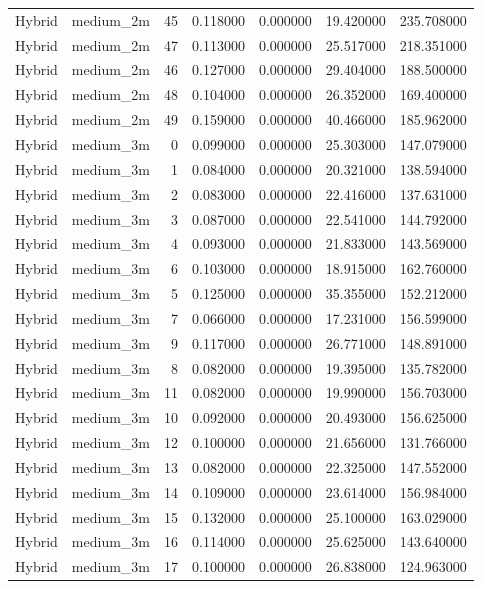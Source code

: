\begin{tabular}{llrrrrr}
Hybrid & medium_2m & 45 & 0.118000 & 0.000000 & 19.420000 & 235.708000 \\
Hybrid & medium_2m & 47 & 0.113000 & 0.000000 & 25.517000 & 218.351000 \\
Hybrid & medium_2m & 46 & 0.127000 & 0.000000 & 29.404000 & 188.500000 \\
Hybrid & medium_2m & 48 & 0.104000 & 0.000000 & 26.352000 & 169.400000 \\
Hybrid & medium_2m & 49 & 0.159000 & 0.000000 & 40.466000 & 185.962000 \\
Hybrid & medium_3m & 0 & 0.099000 & 0.000000 & 25.303000 & 147.079000 \\
Hybrid & medium_3m & 1 & 0.084000 & 0.000000 & 20.321000 & 138.594000 \\
Hybrid & medium_3m & 2 & 0.083000 & 0.000000 & 22.416000 & 137.631000 \\
Hybrid & medium_3m & 3 & 0.087000 & 0.000000 & 22.541000 & 144.792000 \\
Hybrid & medium_3m & 4 & 0.093000 & 0.000000 & 21.833000 & 143.569000 \\
Hybrid & medium_3m & 6 & 0.103000 & 0.000000 & 18.915000 & 162.760000 \\
Hybrid & medium_3m & 5 & 0.125000 & 0.000000 & 35.355000 & 152.212000 \\
Hybrid & medium_3m & 7 & 0.066000 & 0.000000 & 17.231000 & 156.599000 \\
Hybrid & medium_3m & 9 & 0.117000 & 0.000000 & 26.771000 & 148.891000 \\
Hybrid & medium_3m & 8 & 0.082000 & 0.000000 & 19.395000 & 135.782000 \\
Hybrid & medium_3m & 11 & 0.082000 & 0.000000 & 19.990000 & 156.703000 \\
Hybrid & medium_3m & 10 & 0.092000 & 0.000000 & 20.493000 & 156.625000 \\
Hybrid & medium_3m & 12 & 0.100000 & 0.000000 & 21.656000 & 131.766000 \\
Hybrid & medium_3m & 13 & 0.082000 & 0.000000 & 22.325000 & 147.552000 \\
Hybrid & medium_3m & 14 & 0.109000 & 0.000000 & 23.614000 & 156.984000 \\
Hybrid & medium_3m & 15 & 0.132000 & 0.000000 & 25.100000 & 163.029000 \\
Hybrid & medium_3m & 16 & 0.114000 & 0.000000 & 25.625000 & 143.640000 \\
Hybrid & medium_3m & 17 & 0.100000 & 0.000000 & 26.838000 & 124.963000 \\

\end{tabular}
